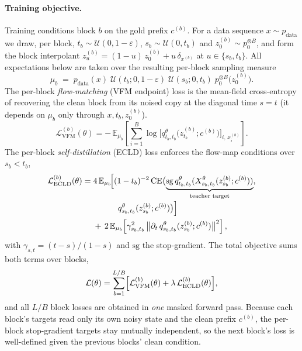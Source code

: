 \documentclass[twocolumn]{style}
\begin{document}
\paragraph{Training objective.} Training conditions block $b$ on the gold prefix $c^{(b)}$. For a data sequence $x\sim p_{\mathrm{data}}$ we draw, per block, $t_b\sim\mathcal{U}(0,1{-}\varepsilon)$, $s_b\sim\mathcal{U}(0,t_b)$ and $z_0^{(b)}\sim p_0^{\otimes B}$, and form the block interpolant $z_u^{(b)}=(1-u)\,z_0^{(b)}+u\,\delta_{x^{(b)}}$ at $u\in\{s_b,t_b\}$. All expectations below are taken over the resulting per-block sampling measure
\begin{equation}
\mu_b\;=\;p_{\mathrm{data}}(x)\;\mathcal{U}(t_b;0,1{-}\varepsilon)\;\mathcal{U}(s_b;0,t_b)\;p_0^{\otimes B}\!\bigl(z_0^{(b)}\bigr).
\label{eq:measure}
\end{equation}
The per-block \emph{flow-matching} (VFM endpoint) loss is the mean-field cross-entropy of recovering the clean block from its noised copy at the diagonal time $s=t$ (it depends on $\mu_b$ only through $x,t_b,z_0^{(b)}$).
\begin{equation}
\mathcal{L}^{(b)}_{\mathrm{VFM}}(\theta)= -\,\mathbb{E}_{\mu_b}\!\left[\sum_{i=1}^{B}\log\bigl[q^\theta_{t_b,t_b}\!\bigl(z_{t_b}^{(b)};c^{(b)}\bigr)\bigr]_{i,\,x^{(b)}_i}\right].
\end{equation}
The per-block \emph{self-distillation} (ECLD) loss enforces the flow-map conditions over $s_b<t_b$,
\begin{align}
\mathcal{L}^{(b)}_{\mathrm{ECLD}}(\theta)=\;& 4\,\mathbb{E}_{\mu_b}\!\Bigl[(1-t_b)^{-2}\,\mathrm{CE}\bigl(\underbrace{\mathrm{sg}\,q^\theta_{t_b,t_b}(X^\theta_{s_b,t_b}(z_{s_b}^{(b)};c^{(b)}))}_{\text{teacher target}},\nonumber\\[-2pt]
&\hphantom{4\,\mathbb{E}_{\mu_b}\Bigl[}\ q^\theta_{s_b,t_b}(z_{s_b}^{(b)};c^{(b)})\bigr)\Bigr]\nonumber\\
&+\,2\,\mathbb{E}_{\mu_b}\!\left[\gamma_{s_b,t_b}^2\,\bigl\|\partial_t\,q^\theta_{s_b,t_b}(z_{s_b}^{(b)};c^{(b)})\bigr\|^2\right],
\end{align}
with $\gamma_{s,t}=(t-s)/(1-s)$ and $\mathrm{sg}$ the stop-gradient. The total objective sums both terms over blocks,
\begin{equation}
\mathcal{L}(\theta)=\sum_{b=1}^{L/B}\Bigl[\mathcal{L}^{(b)}_{\mathrm{VFM}}(\theta)+\lambda\,\mathcal{L}^{(b)}_{\mathrm{ECLD}}(\theta)\Bigr],
\label{eq:total}
\end{equation}
and all $L/B$ block losses are obtained in \emph{one} masked forward pass. Because each block's targets read only its own noisy state and the clean prefix $c^{(b)}$, the per-block stop-gradient targets stay mutually independent, so the next block's loss is well-defined given the previous blocks' clean condition.
\end{document}

